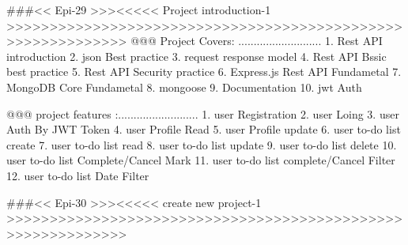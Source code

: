 ###<< Epi-29 >>><<<<< Project introduction-1 >>>>>>>>>>>>>>>>>>>>>>>>>>>>>>>>>>>>>>>>>>>>>>>>>>>>>>>>>>>>
@@@ Project Covers: ...........................
1. Rest API introduction
2. json Best practice
3. request response model
4. Rest API Bssic best practice
5. Rest API Security practice
6. Express.js Rest API Fundametal
7. MongoDB Core Fundametal 
8. mongoose
9. Documentation
10. jwt Auth 

@@@ project features :..........................
1. user Registration
2. user Loing 
3. user Auth By JWT Token
4. user Profile Read
5. user Profile update
6. user to-do list create
7. user to-do list read
8. user to-do list update
9. user to-do list delete 
10. user to-do list Complete/Cancel Mark 
11. user to-do list complete/Cancel Filter
12. user to-do list Date Filter

###<< Epi-30 >>><<<<< create new project-1 >>>>>>>>>>>>>>>>>>>>>>>>>>>>>>>>>>>>>>>>>>>>>>>>>>>>>>>>>>>>